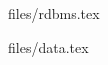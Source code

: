 \documentclass[12px]{article}
\begin{document}
    \nocite{*}
    
    
    \begin{titlepage}
        \vspace{1 cm}
        \contribute
    \end{titlepage}

    \newpage
    \tableofcontents

    \newpage
    \subject{RDBMS}{files/rdbms.tex}
    \subject{Data}{files/data.tex}
\end{document}
